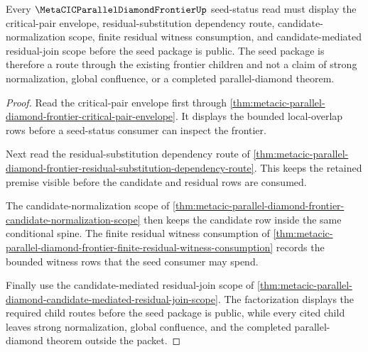 \begin{theorem}
\label{thm:metacicparallel-diamond-frontier-seed-registration}
Every $\MetaCICParallelDiamondFrontierUp$ seed-status read must display the critical-pair envelope, residual-substitution dependency route, candidate-normalization scope, finite residual witness consumption, and candidate-mediated residual-join scope before the seed package is public. The seed package is therefore a route through the existing frontier children and not a claim of strong normalization, global confluence, or a completed parallel-diamond theorem.
\end{theorem}
\begin{proof}
Read the critical-pair envelope first through \autoref{thm:metacic-parallel-diamond-frontier-critical-pair-envelope}. It displays the bounded local-overlap rows before a seed-status consumer can inspect the frontier.

Next read the residual-substitution dependency route of \autoref{thm:metacic-parallel-diamond-frontier-residual-substitution-dependency-route}. This keeps the retained premise visible before the candidate and residual rows are consumed.

The candidate-normalization scope of \autoref{thm:metacic-parallel-diamond-frontier-candidate-normalization-scope} then keeps the candidate row inside the same conditional spine. The finite residual witness consumption of \autoref{thm:metacic-parallel-diamond-frontier-finite-residual-witness-consumption} records the bounded witness rows that the seed consumer may spend.

Finally use the candidate-mediated residual-join scope of \autoref{thm:metacic-parallel-diamond-candidate-mediated-residual-join-scope}. The factorization displays the required child routes before the seed package is public, while every cited child leaves strong normalization, global confluence, and the completed parallel-diamond theorem outside the packet.
\end{proof}

